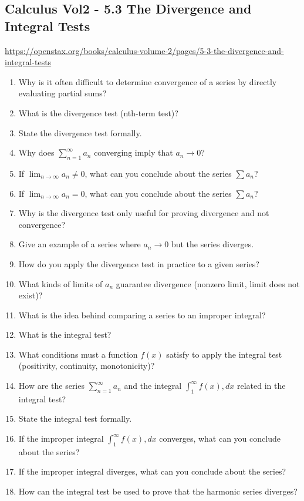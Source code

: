 \subsection{Calculus Vol2 - 5.3 The Divergence and Integral Tests}

\url{https://openstax.org/books/calculus-volume-2/pages/5-3-the-divergence-and-integral-tests}

\begin{enumerate}
  \item Why is it often difficult to determine convergence of a series by directly evaluating partial sums?
  \item What is the divergence test (nth-term test)?
  \item State the divergence test formally.
  \item Why does \(\sum_{n=1}^{\infty}a_{n}\) converging imply that \(a_{n} \to 0\)?
  \item If \(\lim_{n\to\infty}a_{n} \neq 0\), what can you conclude about the series \(\sum a_{n}\)?
  \item If \(\lim_{n\to\infty}a_{n} = 0\), what can you conclude about the series \(\sum a_{n}\)?
  \item Why is the divergence test only useful for proving divergence and not convergence?
  \item Give an example of a series where \(a_{n} \to 0\) but the series diverges.
  \item How do you apply the divergence test in practice to a given series?
  \item What kinds of limits of \(a_{n}\) guarantee divergence (nonzero limit, limit does not exist)?
  \item What is the idea behind comparing a series to an improper integral?
  \item What is the integral test?
  \item What conditions must a function \(f(x)\) satisfy to apply the integral test (positivity, continuity, monotonicity)?
  \item How are the series \(\sum_{n=1}^{\infty}a_{n}\) and the integral \(\int_{1}^{\infty} f(x),dx\) related in the integral test?
  \item State the integral test formally.
  \item If the improper integral \(\int_{1}^{\infty} f(x),dx\) converges, what can you conclude about the series?
  \item If the improper integral diverges, what can you conclude about the series?
  \item How can the integral test be used to prove that the harmonic series diverges?

\end{enumerate}
